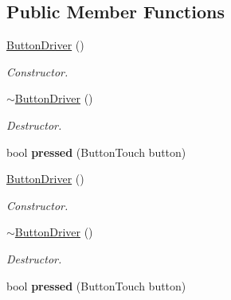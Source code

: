 \subsection*{Public Member Functions}
\begin{DoxyCompactItemize}
\item 
\mbox{\label{classButtonDriver_ae4b4e2a3766aaa3f3a896723a02af376}} 
\hyperlink{classButtonDriver_ae4b4e2a3766aaa3f3a896723a02af376}{Button\+Driver} ()
\begin{DoxyCompactList}\small\item\em Constructor. \end{DoxyCompactList}\item 
\mbox{\label{classButtonDriver_ace9421275f7550584b543adcf09e0b04}} 
\hyperlink{classButtonDriver_ace9421275f7550584b543adcf09e0b04}{$\sim$\+Button\+Driver} ()
\begin{DoxyCompactList}\small\item\em Destructor. \end{DoxyCompactList}\item 
\mbox{\label{classButtonDriver_a3807073360f1631d5e714a87389be407}} 
bool {\bfseries pressed} (Button\+Touch button)
\item 
\mbox{\label{classButtonDriver_ae4b4e2a3766aaa3f3a896723a02af376}} 
\hyperlink{classButtonDriver_ae4b4e2a3766aaa3f3a896723a02af376}{Button\+Driver} ()
\begin{DoxyCompactList}\small\item\em Constructor. \end{DoxyCompactList}\item 
\mbox{\label{classButtonDriver_ace9421275f7550584b543adcf09e0b04}} 
\hyperlink{classButtonDriver_ace9421275f7550584b543adcf09e0b04}{$\sim$\+Button\+Driver} ()
\begin{DoxyCompactList}\small\item\em Destructor. \end{DoxyCompactList}\item 
\mbox{\label{classButtonDriver_a3807073360f1631d5e714a87389be407}} 
bool {\bfseries pressed} (Button\+Touch button)
\item 

\end{DoxyCompactItemize}

